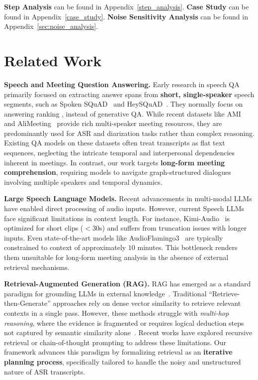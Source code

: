 \documentclass[11pt]{article}
\begin{document}
\textbf{Step Analysis} can be found in Appendix~\ref{step_analysis}.
\textbf{Case Study} can be found in Appendix~\ref{case_study}.
\textbf{Noise Sensitivity Analysis} can be found in Appendix~\ref{sec:noise_analysis}.


\section{Related Work}

\textbf{Speech and Meeting Question Answering.}
Early research in speech QA primarily focused on extracting answer spans from \textbf{short, single-speaker} speech segments, such as Spoken SQuAD~\cite{li2018spokensquadstudymitigating} and HeySQuAD~\cite{wu2023heysquad}. They normally focus on answering ranking \cite{longQA}, instead of generative QA. While recent datasets like AMI~\cite{jain2024insectidentificationwildami} and AliMeeting~\cite{alimeeting} provide rich multi-speaker meeting resources, they are predominantly used for ASR and diarization tasks rather than complex reasoning. Existing QA models on these datasets often treat transcripts as flat text sequences, neglecting the intricate temporal and interpersonal dependencies inherent in meetings. In contrast, our work targets \textbf{long-form meeting comprehension}, requiring models to navigate graph-structured dialogues involving multiple speakers and temporal dynamics.

\textbf{Large Speech Language Models.}
Recent advancements in multi-modal LLMs have enabled direct processing of audio inputs. However, current Speech LLMs face significant limitations in context length. For instance, Kimi-Audio~\cite{kimiteam2025kimiaudiotechnicalreport} is optimized for short clips ($ <30 $s) and suffers from truncation issues with longer inputs. Even state-of-the-art models like AudioFlamingo3~\cite{goel2025audioflamingo3advancing} are typically constrained to context of approximately $ 10 $ minutes. This bottleneck renders them unsuitable for long-form meeting analysis in the absence of external retrieval mechanisms.

\textbf{Retrieval-Augmented Generation (RAG).}
RAG has emerged as a standard paradigm for grounding LLMs in external knowledge~\cite{lewis2020rag}. Traditional ``Retrieve-then-Generate'' approaches rely on dense vector similarity to retrieve relevant contexts in a single pass. However, these methods struggle with \textit{multi-hop reasoning}, where the evidence is fragmented or requires logical deduction steps not captured by semantic similarity alone~\cite{hoprag,graphmpa}. Recent works have explored recursive retrieval or chain-of-thought prompting to address these limitations. Our framework advances this paradigm by formalizing retrieval as an \textbf{iterative planning process}, specifically tailored to handle the noisy and unstructured nature of ASR transcripts.
\end{document}
